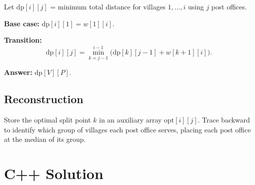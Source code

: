 \documentclass[11pt,a4paper]{article}
\begin{document}
Let $\mathrm{dp}[i][j]$ = minimum total distance for villages $1, \ldots, i$ using
$j$ post offices.

\textbf{Base case:} $\mathrm{dp}[i][1] = w[1][i]$.

\textbf{Transition:}
\[
  \mathrm{dp}[i][j] = \min_{k = j-1}^{i-1} \bigl(\mathrm{dp}[k][j{-}1] + w[k{+}1][i]\bigr).
\]

\textbf{Answer:} $\mathrm{dp}[V][P]$.

\subsection{Reconstruction}

Store the optimal split point $k$ in an auxiliary array $\mathrm{opt}[i][j]$. Trace
backward to identify which group of villages each post office serves, placing each
post office at the median of its group.

\section{C++ Solution}
\end{document}
